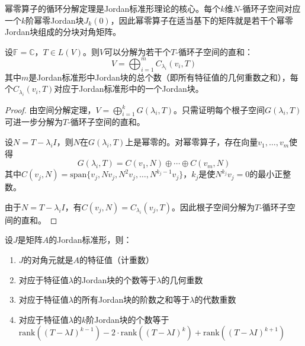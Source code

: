 \begin{remark}
幂零算子的循环分解定理是Jordan标准形理论的核心。每个$k$维$N$-循环子空间对应一个$k$阶幂零Jordan块$J_k(0)$，因此幂零算子在适当基下的矩阵就是若干个幂零Jordan块组成的分块对角矩阵。
\end{remark}



\begin{theorem}[循环子空间分解]
设$\mathbb{F} = \mathbb{C}$，$T \in L(V)$。则$V$可以分解为若干个$T$-循环子空间的直和：
\[
V = \bigoplus_{i=1}^m C_{\lambda_i}(v_i, T)
\]
其中$m$是Jordan标准形中Jordan块的总个数（即所有特征值的几何重数之和），每个$C_{\lambda_i}(v_i, T)$对应于Jordan标准形中的一个Jordan块。
\end{theorem}

\begin{proof}
由空间分解定理，$V = \bigoplus_{i=1}^k G(\lambda_i, T)$。只需证明每个根子空间$G(\lambda_i, T)$可进一步分解为$T$-循环子空间的直和。

设$N = T - \lambda_i I$，则$N$在$G(\lambda_i, T)$上是幂零的。对幂零算子，存在向量$v_1, \ldots, v_m$使得
\[
G(\lambda_i, T) = C(v_1, N) \oplus \cdots \oplus C(v_m, N)
\]
其中$C(v_j, N) = \text{span}\{v_j, Nv_j, N^2v_j, \ldots, N^{k_j-1}v_j\}$，$k_j$是使$N^{k_j}v_j = 0$的最小正整数。

由于$N = T - \lambda_i I$，有$C(v_j, N) = C_{\lambda_i}(v_j, T)$。因此根子空间分解为$T$-循环子空间的直和。
\end{proof}

\begin{proposition}
设$J$是矩阵$A$的Jordan标准形，则：
\begin{enumerate}
    \item $J$的对角元就是$A$的特征值（计重数）
    \item 对应于特征值$\lambda$的Jordan块的个数等于$\lambda$的几何重数
    \item 对应于特征值$\lambda$的所有Jordan块的阶数之和等于$\lambda$的代数重数
    \item 对应于特征值$\lambda$的$k$阶Jordan块的个数等于$\mathrm{rank}((T-\lambda I)^{k-1}) - 2\cdot\mathrm{rank}((T-\lambda I)^k) + \mathrm{rank}((T-\lambda I)^{k+1})$
\end{enumerate}
\end{proposition}

